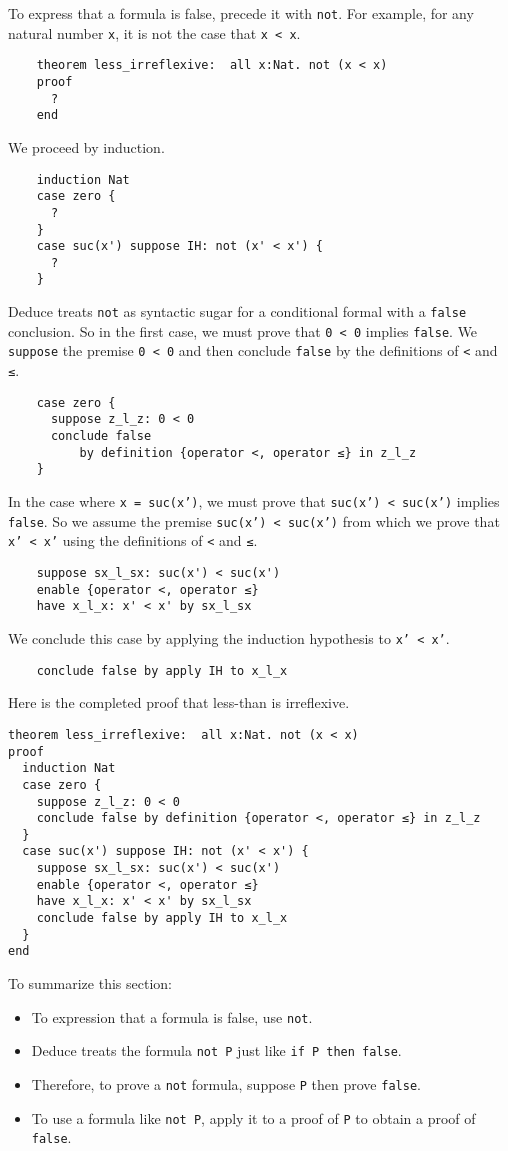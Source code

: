 \documentclass[12pt]{article}
\begin{document}
To express that a formula is false, precede it with \texttt{not}.  For
example, for any natural number \texttt{x}, it is not the case that
\texttt{x < x}.
\begin{verbatim}
    theorem less_irreflexive:  all x:Nat. not (x < x)
    proof
      ?
    end
\end{verbatim}
We proceed by induction.
\begin{verbatim}
    induction Nat
    case zero {
      ?
    }
    case suc(x') suppose IH: not (x' < x') {
      ?
    }
\end{verbatim}
Deduce treats \texttt{not} as syntactic sugar for a conditional formal with a
\texttt{false} conclusion. So in the first case, we must prove 
that \texttt{0 < 0} implies \texttt{false}.
We \texttt{suppose} the premise \texttt{0 < 0} and then conclude
\texttt{false} by the definitions of \texttt{<} and \texttt{≤}.
\begin{verbatim}
    case zero {
      suppose z_l_z: 0 < 0
      conclude false 
          by definition {operator <, operator ≤} in z_l_z
    }
\end{verbatim}
In the case where \texttt{x = suc(x')}, we must prove that
\texttt{suc(x') < suc(x')} implies \texttt{false}.  So we assume the
premise \texttt{suc(x') < suc(x')} from which we prove that
\texttt{x' < x'} using the definitions of \texttt{<} and \texttt{≤}.
\begin{verbatim}
    suppose sx_l_sx: suc(x') < suc(x')
    enable {operator <, operator ≤}
    have x_l_x: x' < x' by sx_l_sx
\end{verbatim}
We conclude this case by applying the induction hypothesis to \texttt{x' < x'}.
\begin{verbatim}
    conclude false by apply IH to x_l_x
\end{verbatim}
Here is the completed proof that less-than is irreflexive.

\begin{verbatim}
theorem less_irreflexive:  all x:Nat. not (x < x)
proof
  induction Nat
  case zero {
    suppose z_l_z: 0 < 0
    conclude false by definition {operator <, operator ≤} in z_l_z
  }
  case suc(x') suppose IH: not (x' < x') {
    suppose sx_l_sx: suc(x') < suc(x')
    enable {operator <, operator ≤}
    have x_l_x: x' < x' by sx_l_sx
    conclude false by apply IH to x_l_x
  }
end
\end{verbatim}

To summarize this section:
\begin{itemize}
\item To expression that a formula is false, use \texttt{not}.
\item Deduce treats the formula \texttt{not P} just like \texttt{if P
  then false}.
\item Therefore, to prove a \texttt{not} formula, suppose \texttt{P}
  then prove \texttt{false}.
\item To use a formula like \texttt{not P}, apply it to a proof of
  \texttt{P} to obtain a proof of \texttt{false}.
\end{itemize}
\end{document}
